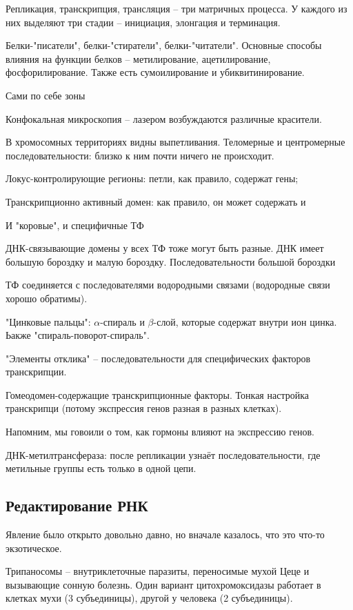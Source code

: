 \documentclass[main.tex]{subfiles}
\begin{document}
Репликация, транскрипция, трансляция -- три матричных процесса.
У каждого из них выделяют три стадии -- инициация, элонгация и терминация.

Белки-"писатели", белки-"стиратели", белки-"читатели".
Основные способы влияния на функции белков -- метилирование, ацетилирование, фосфорилирование.
Также есть сумоилирование и убиквитинирование.

Сами по себе зоны

Конфокальная микроскопия -- лазером возбуждаются различные красители.

В хромосомных территориях видны выпетливания.
Теломерные и центромерные последовательности: близко к ним почти ничего не происходит.

Локус-контролирующие регионы: петли, как правило, содержат гены; %

Транскрипционно активный домен: как правило, он может содержать и %

И "коровые", и специфичные ТФ 

ДНК-связывающие домены у всех ТФ тоже могут быть разные.
ДНК имеет большую бороздку и малую бороздку.
Последовательности большой бороздки 

ТФ соединяется с последователями водородными связами (водородные связи хорошо обратимы).

"Цинковые пальцы": $\alpha$-спираль и $\beta$-слой, которые содержат внутри ион цинка.
Ьакже "спираль-поворот-спираль".

"Элементы отклика" -- последовательности для специфических факторов транскрипции.

Гомеодомен-содержащие транскрипционные факторы.
Тонкая настройка транскрипци (потому экспрессия генов разная в разных клетках).

Напомним, мы говоили о том, как гормоны влияют на экспрессию генов.

ДНК-метилтрансфераза: после репликации узнаёт последовательности, где метильные группы есть только в одной цепи.

\subsection{Редактирование РНК}

Явление было открыто довольно давно, но вначале казалось, что это что-то экзотическое.

Трипаносомы -- внутриклеточные паразиты, переносимые мухой Цеце и вызывающие сонную болезнь.
Один вариант цитохромоксидазы работает в клетках мухи (3 субъединицы), другой у человека (2 субъединицы).
\end{document}
